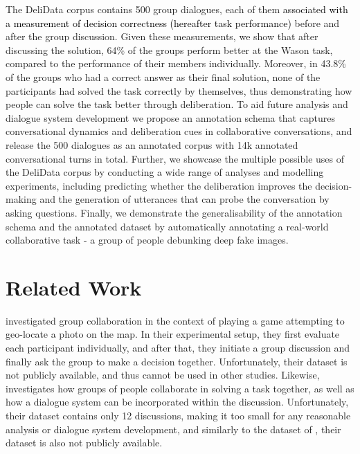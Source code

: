 \documentclass[acmsmall,manuscript,screen]{acmart}
\newcommand\newtext[1]{\textcolor{black}{#1}}
\newcommand\delidata{DeliData }
\begin{document}
The \delidata corpus contains 500 group dialogues, each of them \newtext{associated with a measurement of decision correctness (hereafter task performance)} before and after the group discussion. Given these measurements, we show that after discussing the solution, 64\% of the groups perform better at the Wason task, compared to the performance of their members individually. Moreover, in 43.8\% of the groups who had a correct answer as their final solution, none of the participants had solved the task correctly by themselves, thus demonstrating how people can solve the task better through deliberation. To aid future analysis and dialogue system development we propose an annotation schema that captures conversational dynamics and deliberation cues in collaborative conversations, and release the 500 dialogues as an annotated corpus with 14k annotated conversational turns in total.
Further, we showcase the multiple possible uses of the DeliData corpus by conducting a wide range of analyses and modelling experiments, including predicting whether the deliberation improves the decision-making and the generation of utterances that can probe the conversation by asking questions.
Finally, we demonstrate the generalisability of the annotation schema and the annotated dataset by automatically annotating a real-world collaborative task - a group of people debunking deep fake images.



\section{Related Work}




\citet{niculae2016conversational} investigated group collaboration in the context of playing a game attempting to geo-locate a photo on the map. In their experimental setup, they first evaluate each participant individually, and after that, they initiate a group discussion and finally ask the group to make a decision together. Unfortunately, their dataset is not publicly available, and thus cannot be used in other studies.
Likewise, \citet{debatebot} investigates how groups of people collaborate in solving a task together, as well as how a dialogue system can be incorporated within the discussion. Unfortunately, their dataset contains only 12 discussions, making it too small for any reasonable analysis or dialogue system development, and similarly to the dataset of \citet{niculae2016conversational}, their dataset is also not publicly available. 
\end{document}
